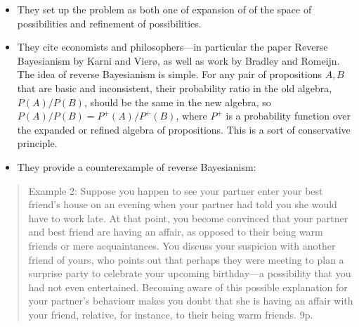 \documentclass[
  11pt,
  dvipsnames,enabledeprecatedfontcommands]{scrartcl}
\begin{document}
\begin{itemize}
\item
  They set up the problem as both one of expansion of of the space of
  possibilities and refinement of possibilities.
\item
  They cite economists and philosophers---in particular the paper
  Reverse Bayesianism by Karni and Vierø, as well as work by Bradley and
  Romeijn. The idea of reverse Bayesianism is simple. For any pair of
  propositions \(A, B\) that are basic and inconsistent, their
  probability ratio in the old algebra, \(P(A)/P(B)\), should be the
  same in the new algebra, so \(P(A)/P(B)=P^+(A)/P^+(B)\), where \(P^+\)
  is a probability function over the expanded or refined algebra of
  propositions. This is a sort of conservative principle.
\item
  They provide a counterexample of reverse Bayesianism:
\end{itemize}

\begin{quote}
Example 2: Suppose you happen to see your partner enter your best
friend's house on an evening when your partner had told you she would
have to work late. At that point, you become convinced that your partner
and best friend are having an affair, as opposed to their being warm
friends or mere acquaintances. You discuss your suspicion with another
friend of yours, who points out that perhaps they were meeting to plan a
surprise party to celebrate your upcoming birthday---a possibility that
you had not even entertained. Becoming aware of this possible
explanation for your partner's behaviour makes you doubt that she is
having an affair with your friend, relative, for instance, to their
being warm friends. 9p.
\end{quote}
\end{document}
